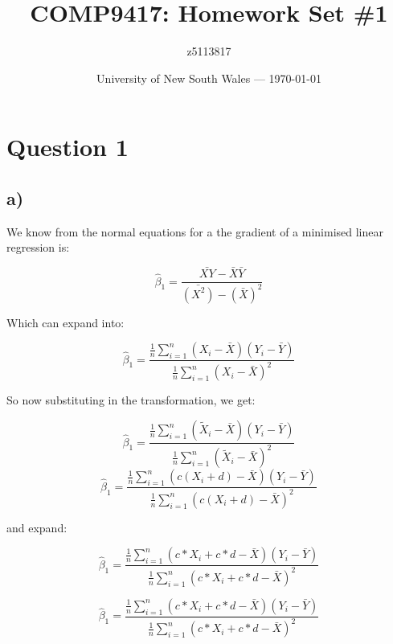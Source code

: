 \documentclass{article}
\title{COMP9417: Homework Set \#1} %
\author{z5113817} %
\date{University of New South Wales --- \today} %
\newcommand\simplelrg{\hat{\beta}_{1} = \frac{\bar{XY} - \bar{X}\bar{Y}}{\bar{(X^2)} - (\bar{X})^2}}
\newcommand\sumlrg{\frac{1}{n}\sum_{i=1}^{n}(}
\newcommand\expandedlrg{\hat{\beta}_{1} = \frac{\sumlrg{}X_{i} - \bar{X})(Y_{i} - \bar{Y})}{\sumlrg{}X_{i} - \bar{X})^2}}
\begin{document}
\maketitle %


\section*{Question 1}

\subsection*{a)}

We know from the normal equations for a the gradient of a minimised linear regression is:

\begin{equation*}
	\simplelrg{}
\end{equation*}

Which can expand into:

\begin{equation*}
	\expandedlrg{}
\end{equation*}

So now substituting in the transformation, we get:

\begin{equation}
	\hat{\beta}_{1} = \frac{\sumlrg{}\tilde{X}_{i} - \bar{X})(Y_{i} - \bar{Y})}{\sumlrg{}\tilde{X}_{i} - \bar{X})^2}
\end{equation}
\begin{equation}
	\hat{\beta}_{1} = \frac{\sumlrg{}c(X_{i} + d) - \bar{X})(Y_{i} - \bar{Y})}{\sumlrg{}c(X_{i} + d) - \bar{X})^2}
\end{equation}

and expand:

\begin{equation}
	\hat{\beta}_{1} = \frac{\sumlrg{}c*X_{i} + c*d - \bar{X})(Y_{i} - \bar{Y})}{\sumlrg{}c*X_{i} + c*d - \bar{X})^2}
\end{equation}

\begin{equation}
	\hat{\beta}_{1} = \frac{\sumlrg{}c*X_{i} + c*d - \bar{X})(Y_{i} - \bar{Y})}{\sumlrg{}c*X_{i} + c*d - \bar{X})^2}
\end{equation}
\end{document}
